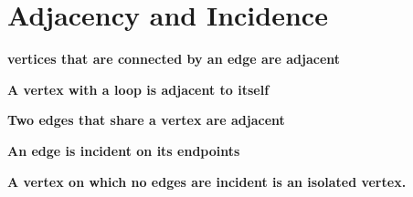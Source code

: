 \documentclass{report}
\begin{document}
    \pagebreak \bigbreak \noindent 
    \section{\LARGE Adjacency and Incidence}
    \smallbreak \noindent
    \begin{definition}
        \textbf{vertices that are connected by an edge are  \textbf{adjacent}} 
    \end{definition}
    \smallbreak \noindent
    \begin{definition}
        \textbf{A vertex with a loop is \textbf{adjacent to itself}} 
    \end{definition}
    \smallbreak \noindent
    \begin{definition}
        \textbf{Two edges that share a vertex are \textbf{adjacent}} 
    \end{definition}
    \smallbreak \noindent
    \begin{definition}
        \textbf{An edge is \textbf{incident} on its endpoints} 
    \end{definition}
    \smallbreak \noindent
    \begin{definition}
    \textbf{A vertex on which no edges are incident is an \textbf{isolated vertex.}} 
    \end{definition}

    \pagebreak \bigbreak \noindent 
\end{document}
